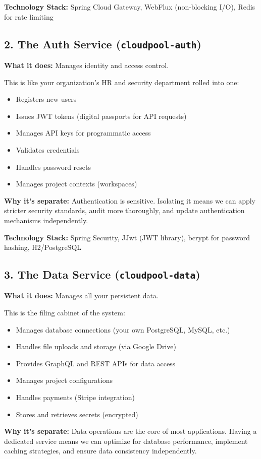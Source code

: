 \documentclass[11pt,a4paper]{report}
\begin{document}
\textbf{Technology Stack:} Spring Cloud Gateway, WebFlux (non-blocking I/O), Redis for rate limiting


\subsection{2. \textbf{The Auth Service} (\texttt{cloudpool-auth})}

\textbf{What it does:} Manages identity and access control.

This is like your organization's HR and security department rolled into one:

\begin{itemize}
\item Registers new users
\item Issues JWT tokens (digital passports for API requests)
\item Manages API keys for programmatic access
\item Validates credentials
\item Handles password resets
\item Manages project contexts (workspaces)

\end{itemize}
\textbf{Why it's separate:} Authentication is sensitive. Isolating it means we can apply stricter security standards, audit more thoroughly, and update authentication mechanisms independently.

\textbf{Technology Stack:} Spring Security, JJwt (JWT library), bcrypt for password hashing, H2/PostgreSQL


\subsection{3. \textbf{The Data Service} (\texttt{cloudpool-data})}

\textbf{What it does:} Manages all your persistent data.

This is the filing cabinet of the system:

\begin{itemize}
\item Manages database connections (your own PostgreSQL, MySQL, etc.)
\item Handles file uploads and storage (via Google Drive)
\item Provides GraphQL and REST APIs for data access
\item Manages project configurations
\item Handles payments (Stripe integration)
\item Stores and retrieves secrets (encrypted)

\end{itemize}
\textbf{Why it's separate:} Data operations are the core of most applications. Having a dedicated service means we can optimize for database performance, implement caching strategies, and ensure data consistency independently.
\end{document}
